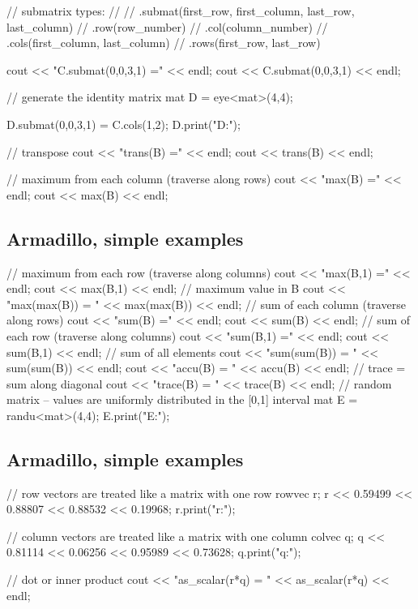 \documentclass[%
twoside,                 %
final,                   %
10pt]{article}
\begin{document}
{\bcppcod
  // submatrix types:
  //
  // .submat(first_row, first_column, last_row, last_column)
  // .row(row_number)
  // .col(column_number)
  // .cols(first_column, last_column)
  // .rows(first_row, last_row)

  cout << "C.submat(0,0,3,1) =" << endl;
  cout << C.submat(0,0,3,1) << endl;

  // generate the identity matrix
  mat D = eye<mat>(4,4);

  D.submat(0,0,3,1) = C.cols(1,2);
  D.print("D:");

  // transpose
  cout << "trans(B) =" << endl;
  cout << trans(B) << endl;

  // maximum from each column (traverse along rows)
  cout << "max(B) =" << endl;
  cout << max(B) << endl;

\ecppcod

\subsection{Armadillo, simple examples}

\bcppcod
  // maximum from each row (traverse along columns)
  cout << "max(B,1) =" << endl;
  cout << max(B,1) << endl;
  // maximum value in B
  cout << "max(max(B)) = " << max(max(B)) << endl;
  // sum of each column (traverse along rows)
  cout << "sum(B) =" << endl;
  cout << sum(B) << endl;
  // sum of each row (traverse along columns)
  cout << "sum(B,1) =" << endl;
  cout << sum(B,1) << endl;
  // sum of all elements
  cout << "sum(sum(B)) = " << sum(sum(B)) << endl;
  cout << "accu(B)     = " << accu(B) << endl;
  // trace = sum along diagonal
  cout << "trace(B)    = " << trace(B) << endl;
  // random matrix -- values are uniformly distributed in the [0,1] interval
  mat E = randu<mat>(4,4);
  E.print("E:");

\ecppcod

\subsection{Armadillo, simple examples}

\bcppcod
  // row vectors are treated like a matrix with one row
  rowvec r;
  r << 0.59499 << 0.88807 << 0.88532 << 0.19968;
  r.print("r:");

  // column vectors are treated like a matrix with one column
  colvec q;
  q << 0.81114 << 0.06256 << 0.95989 << 0.73628;
  q.print("q:");

  // dot or inner product
  cout << "as_scalar(r*q) = " << as_scalar(r*q) << endl;

}
\end{document}
